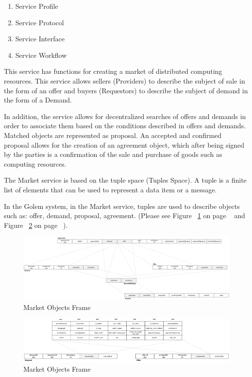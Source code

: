 \begin{enumerate}
    \item Service Profile
    \item Service Protocol
    \item Service Interface
    \item Service Workflow
\end{enumerate}

\break


This service has functions for creating a market of distributed computing resources.
This service allows sellers (Providers) to describe the subject of sale in the form of an offer
and buyers (Requestors) to describe the subject of demand in the form of a Demand.

In addition, the service allows for decentralized searches of offers and demands in order to associate them
based on the conditions described in offers and demands. Matched objects are represented as
proposal. An accepted and confirmed proposal allows for the creation of an agreement object, which
after being signed by the parties is a confirmation of the sale and purchase of goods such as computing resources.

The Market service is based on the tuple space (Tuples Space).
A tuple is a finite list of elements that can be used to represent a data item or a message.

In the Golem system, in the Market service, tuples are used to describe objects such as:
offer, demand, proposal, agreement. (Please see Figure ~\ref{fig:MF1} on page ~\pageref{fig:MF1}
and Figure ~\ref{fig:MF2} on page ~\pageref{fig:MF2}).

\begin{figure}[htbp]
    \centering
    \includegraphics[width=12cm,angle=0]{./diag/Reference/MarketFrame-1-Reference.png}
	\caption{Market Objects Frame}
    \label{fig:MF1}
\end{figure}


\begin{figure}[htbp]
    \centering
    \includegraphics[width=12cm,angle=0]{./diag/Reference/MarketFrame-2-Reference.png}
	\caption{Market Objects Frame}
    \label{fig:MF2}
\end{figure}

